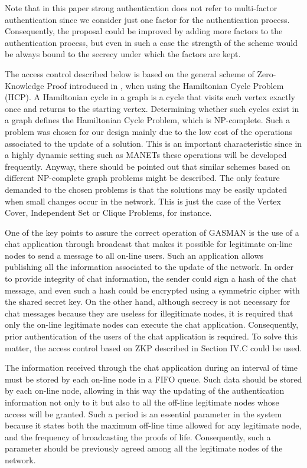 \documentclass{article}
\begin{document}
Note that in this paper strong authentication does not refer to multi-factor authentication \cite{GKD05} since we  consider just one factor for the authentication process. Consequently, the proposal could be improved by adding more factors to the authentication process, but even in such a case the strength of the scheme would be always bound to the secrecy under which the factors are kept.

The access control described below is based on the general scheme
of Zero-Knowledge Proof introduced in \cite{CH01}, when using the
Hamiltonian Cycle Problem (HCP). A Hamiltonian cycle in a graph is
a cycle that visits each vertex exactly once and returns to the
starting vertex. Determining whether such cycles exist in a graph
defines the Hamiltonian Cycle Problem, which is NP-complete. Such
a problem was chosen for our design mainly due to the low cost of
the operations associated to the update of a solution. This is an
important characteristic since in a highly dynamic setting such as
MANETs these operations will be developed frequently. Anyway,
there should be pointed out that similar schemes based on
different NP-complete graph problems might be described. The only
feature demanded to the chosen problems  is that the solutions may
be easily updated when small changes occur in the network. This is
just the case of the Vertex Cover, Independent Set or Clique
Problems, for instance.

One of the key points to assure the correct operation of GASMAN is the use of a chat application through broadcast that
makes it possible for legitimate on-line nodes to send a message
to all on-line users. Such an application allows
publishing all the information associated to the update of the
network. In order to provide integrity of chat information, the sender could sign a hash of the chat message, and even such a hash could be encrypted using a symmetric cipher with the shared secret key. On the other hand, although secrecy is not necessary for chat messages because they are useless for illegitimate nodes, it is required that only the on-line legitimate nodes can execute the chat application. Consequently, prior authentication of the users of the chat application is required. To solve this matter, the access control based on ZKP described in Section IV.C could be used.

The information received through the chat application during an
interval of time must be stored by each on-line node in a FIFO
queue. Such data should be stored by each on-line node, allowing in this way the updating of
the authentication information not only to it but also to all the
off-line legitimate nodes whose access will be granted. Such a period is an essential
parameter in the system because it states both the maximum off-line time allowed
for any legitimate node, and the frequency of broadcasting the proofs
of life. Consequently, such a parameter should be previously
agreed among all the legitimate nodes of the network.
\end{document}
